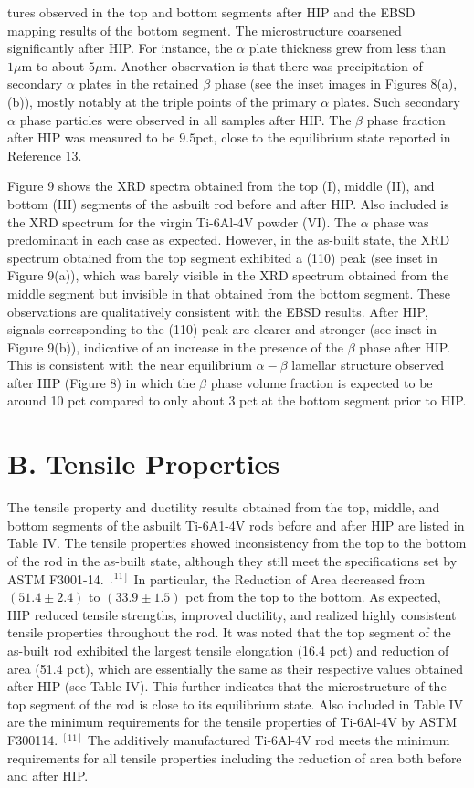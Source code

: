 \documentclass[10pt]{article}
\begin{document}
tures observed in the top and bottom segments after HIP and the EBSD mapping results of the bottom segment. The microstructure coarsened significantly after HIP. For instance, the $\alpha$ plate thickness grew from less than $1 \mu \mathrm{m}$ to about $5 \mu \mathrm{m}$. Another observation is that there was precipitation of secondary $\alpha$ plates in the retained $\beta$ phase (see the inset images in Figures 8(a), (b)), mostly notably at the triple points of the primary $\alpha$ plates. Such secondary $\alpha$ phase particles were observed in all samples after HIP. The $\beta$ phase fraction after HIP was measured to be $9.5 \mathrm{pct}$, close to the equilibrium state reported in Reference 13.

Figure 9 shows the XRD spectra obtained from the top (I), middle (II), and bottom (III) segments of the asbuilt rod before and after HIP. Also included is the XRD spectrum for the virgin Ti-6Al-4V powder (VI). The $\alpha$ phase was predominant in each case as expected. However, in the as-built state, the XRD spectrum obtained from the top segment exhibited a (110) peak (see inset in Figure 9(a)), which was barely visible in the XRD spectrum obtained from the middle segment but invisible in that obtained from the bottom segment. These observations are qualitatively consistent with the EBSD results. After HIP, signals corresponding to the (110) peak are clearer and stronger (see inset in Figure 9(b)), indicative of an increase in the presence of the $\beta$ phase after HIP. This is consistent with the near equilibrium $\alpha-\beta$ lamellar structure observed after HIP (Figure 8) in which the $\beta$ phase volume fraction is expected to be around 10 pct compared to only about 3 pct at the bottom segment prior to HIP.

\section*{B. Tensile Properties}
The tensile property and ductility results obtained from the top, middle, and bottom segments of the asbuilt Ti-6A1-4V rods before and after HIP are listed in Table IV. The tensile properties showed inconsistency from the top to the bottom of the rod in the as-built state, although they still meet the specifications set by ASTM F3001-14. ${ }^{[11]}$ In particular, the Reduction of Area decreased from $(51.4 \pm 2.4)$ to $(33.9 \pm 1.5)$ pct from the top to the bottom. As expected, HIP reduced tensile strengths, improved ductility, and realized highly consistent tensile properties throughout the rod. It was noted that the top segment of the as-built rod exhibited the largest tensile elongation (16.4 pct) and reduction of area (51.4 pct), which are essentially the same as their respective values obtained after HIP (see Table IV). This further indicates that the microstructure of the top segment of the rod is close to its equilibrium state. Also included in Table IV are the minimum requirements for the tensile properties of Ti-6Al-4V by ASTM F300114. ${ }^{[11]}$ The additively manufactured Ti-6Al-4V rod meets the minimum requirements for all tensile properties including the reduction of area both before and after HIP.
\end{document}
